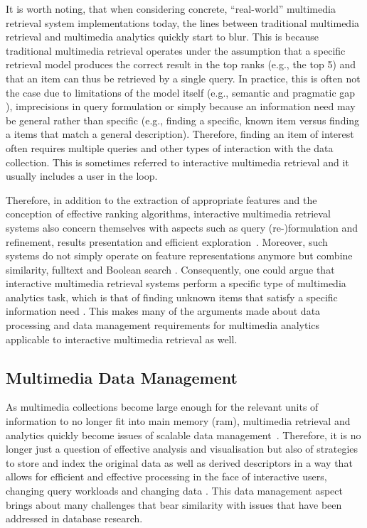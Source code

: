 It is worth noting, that when considering concrete, ``real-world'' multimedia retrieval system implementations today, the lines between traditional multimedia retrieval and multimedia analytics quickly start to blur. This is because traditional multimedia retrieval operates under the assumption that a specific retrieval model produces the correct result in the top ranks (e.g., the top 5) and that an item can thus be retrieved by a single query. In practice, this is often not the case due to limitations of the model itself (e.g., semantic and pragmatic gap \cite{Zahalka:2014Towards}), imprecisions in query formulation or simply because an information need may be general rather than specific (e.g., finding a specific, known item versus finding a items that match a general description). Therefore, finding an item of interest often requires multiple queries and other types of interaction with the data collection. This is sometimes referred to interactive multimedia retrieval and it usually includes a user in the loop.

Therefore, in addition to the extraction of appropriate features and the conception of effective ranking algorithms, interactive multimedia retrieval systems also concern themselves with aspects such as query (re-)formulation and refinement, results presentation and efficient exploration~\cite{Lokovc:2019Interactive}. Moreover, such systems do not simply operate on feature representations anymore but combine similarity, fulltext and Boolean search \cite{Rossetto:2020Interactive}. Consequently, one could argue that interactive multimedia retrieval systems perform a specific type of multimedia analytics task, which is that of finding unknown items that satisfy a specific information need \cite{Seebacher:2017Visual}. This makes many of the arguments made about data processing and data management requirements for multimedia analytics applicable to interactive multimedia retrieval as well.

\subsection{Multimedia Data Management}

As multimedia collections become large enough for the relevant units of information to no longer fit into main memory (\acrshort{ram}), multimedia retrieval and analytics quickly become issues of scalable data management~\cite{Jonsson:2016Ten,Pouyanfar:2018,Vrochidis:2019Big}. Therefore, it is no longer just a question of effective analysis and visualisation but also of strategies to store and index the original data as well as derived descriptors in a way that allows for efficient and effective processing in the face of interactive users, changing query workloads and changing data \cite{Smeulders:2000Content}. This data management aspect brings about many challenges that bear similarity with issues that have been addressed in database research.

